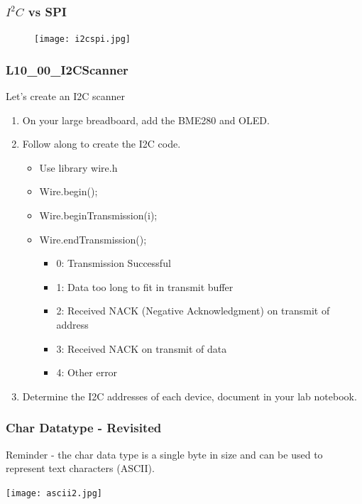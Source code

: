 \documentclass{beamer}
\begin{document}
\begin{frame}\frametitle{$I^{2}C$ vs SPI}
\begin{figure}[h]
	\texttt{[image: i2cspi.jpg]}
\end{figure}
\end{frame}

\begin{frame}\frametitle{L10\_00\_I2CScanner}
Let's create an I2C scanner
\begin{enumerate}
\item On your large breadboard, add the BME280 and OLED. 
\item Follow along to create the I2C code.
	\begin{itemize}
	\item Use library wire.h
	\item Wire.begin();
	\item Wire.beginTransmission(i);
	\item Wire.endTransmission();
		\begin{itemize}
		\item 0: Transmission Successful
		\item 1: Data too long to fit in transmit buffer
		\item 2: Received NACK (Negative Acknowledgment) on transmit of address
		\item 3: Received NACK on transmit of data
		\item 4: Other error
		\end{itemize}
	\end{itemize}
\item Determine the I2C addresses of each device, document in your lab notebook.
\end{enumerate}
\end{frame}



\begin{frame}\frametitle{Char Datatype - Revisited}
Reminder - the char data type is a single byte in size and can be used to represent text characters (ASCII).
\begin{center}
\texttt{[image: ascii2.jpg]}
\end{center}
\lstascii
\end{frame}
\end{document}
